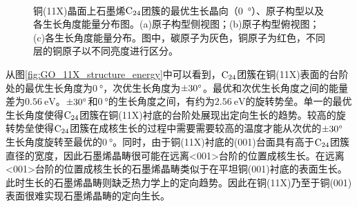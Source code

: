 \begin{figure}[!htb]
    \centering
    \\[-0.5ex]
    \caption{铜(11X)晶面上石墨烯$\rm{C_{24}}$团簇的最优生长晶向（\SI{0}{\degree}）、原子构型以及各生长角度能量分布图。(a)原子构型侧视图；(b)原子构型俯视图；(c)各生长角度能量分布。图中，碳原子为灰色，铜原子为红色，不同层的铜原子以不同亮度进行区分。}
    \label{fig:GO_C24_11X}
\end{figure}

从图\ref{fig:GO_11X_structure_energy}中可以看到，$\rm{C_{24}}$团簇在铜(11X)表面的台阶处的最优生长角度为$\SI{0}{\degree}$，次优生长角度为$\SI{\pm 30 }{\degree}$。最优和次优生长角度之间的能量差为$\SI{0.56 }{\electronvolt}$。$\SI{\pm 30 }{\degree}$和$\SI{0}{\degree}$的生长角度之间，有约为$\SI{2.56}{\electronvolt}$的旋转势垒。单一的最优生长角度使得$\rm{C_{24}}$团簇在铜(11X)衬底的台阶处展现出定向生长的趋势。较高的旋转势垒使得$\rm{C_{24}}$团簇在成核生长的过程中需要需要较高的温度才能从次优的$\SI{\pm 30 }{\degree}$生长角度旋转至最优的$\SI{0 }{\degree}$。同时，由于铜(11X)衬底的(001)台面具有高于$\rm{C_{24}}$团簇直径的宽度，因此石墨烯晶畴很可能在远离<001>台阶的位置成核生长。在远离<001>台阶的位置成核生长的石墨烯晶畴类似于在平坦铜(001)衬底的表面生长。此时生长的石墨烯晶畴则缺乏热力学上的定向趋势。因此在铜(11X)乃至于铜(001)表面很难实现石墨烯晶畴的定向生长。

